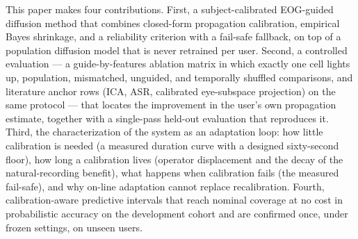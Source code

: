 This paper makes four contributions. First, a subject-calibrated EOG-guided diffusion method that combines closed-form propagation calibration, empirical Bayes shrinkage, and a reliability criterion with a fail-safe fallback, on top of a population diffusion model that is never retrained per user. Second, a controlled evaluation --- a guide-by-features ablation matrix in which exactly one cell lights up, population, mismatched, unguided, and temporally shuffled comparisons, and literature anchor rows (ICA, ASR, calibrated eye-subspace projection) on the same protocol --- that locates the improvement in the user's own propagation estimate, together with a single-pass held-out evaluation that reproduces it. Third, the characterization of the system as an adaptation loop: how little calibration is needed (a measured duration curve with a designed sixty-second floor), how long a calibration lives (operator displacement and the decay of the natural-recording benefit), what happens when calibration fails (the measured fail-safe), and why on-line adaptation cannot replace recalibration. Fourth, calibration-aware predictive intervals that reach nominal coverage at no cost in probabilistic accuracy on the development cohort and are confirmed once, under frozen settings, on unseen users.
